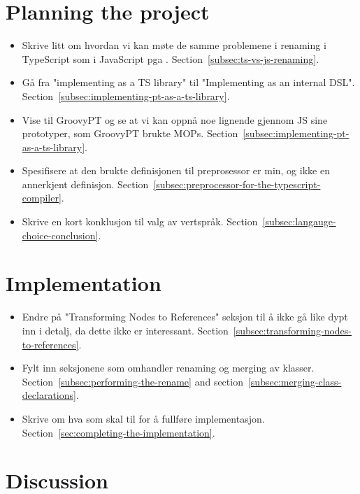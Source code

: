 \section*{Planning the project}

\begin{itemize}
    \item Skrive litt om hvordan vi kan møte de samme problemene i renaming i TypeScript som i JavaScript pga .
    Section~\vref{subsec:ts-vs-js-renaming}.
    \item Gå fra "implementing as a TS library" til "Implementing as an internal DSL".
    Section~\vref{subsec:implementing-pt-as-a-ts-library}.
    \item Vise til GroovyPT og se at vi kan oppnå noe lignende gjennom JS sine prototyper, som GroovyPT brukte MOPs.
    Section~\vref{subsec:implementing-pt-as-a-ts-library}.
    \item Spesifisere at den brukte definisjonen til preprosessor er min, og ikke en annerkjent definisjon.
    Section~\vref{subsec:preprocessor-for-the-typescript-compiler}.
    \item Skrive en kort konklusjon til valg av vertspråk.
    Section~\vref{subsec:langauge-choice-conclusion}.
\end{itemize}

\section*{Implementation}

\begin{itemize}
    \item Endre på "Transforming Nodes to References" seksjon til å ikke gå like dypt inn i detalj, da dette ikke er interessant.
    Section~\vref{subsec:transforming-nodes-to-references}.
    \item Fylt inn seksjonene som omhandler renaming og merging av klasser.
    Section~\vref{subsec:performing-the-rename} and section~\vref{subsec:merging-class-declarations}.
    \item Skrive om hva som skal til for å fullføre implementasjon.
    Section~\vref{sec:completing-the-implementation}.
\end{itemize}

\section*{Discussion}

